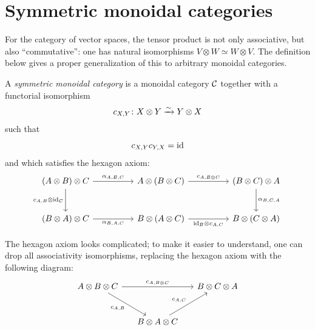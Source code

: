 \section{Symmetric monoidal categories}\label{s:symmetric-monoidal}
For the category of vector spaces, the tensor product is not only associative,
but also ``commutative'': one has natural isomorphisms $V\otimes W \simeq
W\otimes V$. The definition below gives a proper generalization of this to
arbitrary monoidal categories.

\begin{definition}\label{d:symmetric}
  A \emph{symmetric monoidal category} is a monoidal category $\mathcal{C}$ together
  with a functorial isomorphism
  $$
    c_{X,Y}\colon X\otimes Y \xrightarrow{\sim} Y\otimes X
  $$
  such that
  $$
  c_{X,Y} c_{Y,X}=\operatorname{id}
  $$
  and which satisfies the hexagon axiom:
  \begin{equation}\label{e:hexagon1}
    \begin{tikzcd}[column sep=huge, row sep=large]
      (A\otimes B)\otimes C
      \arrow[r,"\alpha_{A,B,C}"]
      \arrow[d,"c_{A,B}\otimes \mathrm{id}_C"']
      & A\otimes(B\otimes C)
      \arrow[r,"c_{A,B\otimes C}"]
      & (B\otimes C)\otimes A
      \arrow[d,"\alpha_{B,C,A}"] \\
      (B\otimes A)\otimes C
      \arrow[r,"\alpha_{B,A,C}"']
      & B\otimes(A\otimes C)
      \arrow[r,"\mathrm{id}_B\otimes c_{A,C}"']
      & B\otimes(C\otimes A)
    \end{tikzcd}
  \end{equation}
\end{definition}
The hexagon axiom looks complicated; to make it easier to understand, one
can drop all associativity isomorphisms, replacing the hexagon axiom with the
following diagram:
\begin{equation}\label{e:hexagon3}
  \begin{tikzcd}[column sep=5mm, row sep=large]
    A\otimes B\otimes C
    \arrow[rr,"c_{A, B\otimes C}"]
    \arrow[dr,"c_{A,B}"']
    && B\otimes C\otimes A\\
    & B\otimes A\otimes C
    \arrow[ur,"c_{A,C}"]  &
  \end{tikzcd}
\end{equation}

